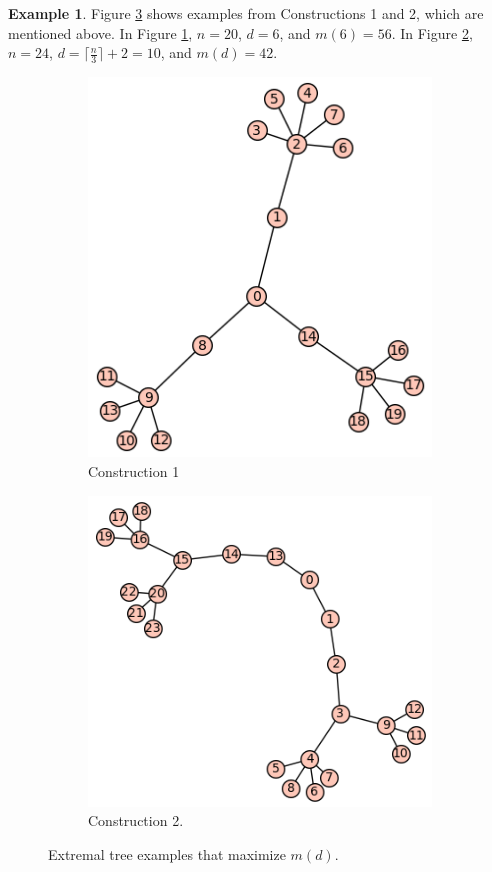 \documentclass[12]{article}
\theoremstyle{definition}
\newtheorem{eg}{Example}
\begin{document}
	\begin{eg}
		Figure \ref{Figure-ExtremalTreeExamples} shows examples from Constructions 1 and 2, which are mentioned above.  In Figure \ref{Figure-ExtremalTreeExamples-a}, $n = 20$, $d = 6$, and $m(6) = 56$.  In Figure \ref{Figure-ExtremalTreeExamples-b}, $n = 24$, $d=\lceil \frac{n}{3} \rceil + 2 = 10$, and $m(d) = 42$.
		
		\begin{figure}[h]
			\centering
			\begin{subfigure}{6.5cm}
				\includegraphics[scale=0.65]{ExtremalTreeExample2.png}
				\caption{Construction 1}\label{Figure-ExtremalTreeExamples-a}
			\end{subfigure}
			\begin{subfigure}{6.5cm}
				\includegraphics[scale=0.65]{ExtremalTreeExample1.png}
				\caption{Construction 2.}\label{Figure-ExtremalTreeExamples-b}
			\end{subfigure}
			\caption{Extremal tree examples that maximize $m(d)$.}\label{Figure-ExtremalTreeExamples}
		\end{figure}
	\end{eg}
\end{document}
